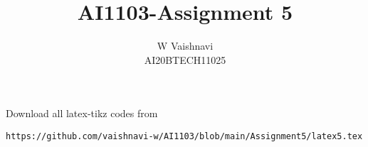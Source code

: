 \documentclass[journal,12pt,twocolumn]{IEEEtran}
\DeclareMathOperator*{\Res}{Res}
\begin{document}
\newcommand{\BEQA}{\begin{eqnarray}}
\newcommand{\EEQA}{\end{eqnarray}}
\newcommand{\define}{\stackrel{\triangle}{=}}

\raggedbottom
\setlength{\parindent}{0pt}
\providecommand{\mbf}{\mathbf}
\providecommand{\pr}[1]{\ensuremath{\Pr\left(#1\right)}}
\providecommand{\qfunc}[1]{\ensuremath{Q\left(#1\right)}}
\providecommand{\sbrak}[1]{\ensuremath{{}\left[#1\right]}}
\providecommand{\lsbrak}[1]{\ensuremath{{}\left[#1\right.}}
\providecommand{\rsbrak}[1]{\ensuremath{{}\left.#1\right]}}
\providecommand{\brak}[1]{\ensuremath{\left(#1\right)}}
\providecommand{\lbrak}[1]{\ensuremath{\left(#1\right.}}
\providecommand{\rbrak}[1]{\ensuremath{\left.#1\right)}}
\providecommand{\cbrak}[1]{\ensuremath{\left\{#1\right\}}}
\providecommand{\lcbrak}[1]{\ensuremath{\left\{#1\right.}}
\providecommand{\rcbrak}[1]{\ensuremath{\left.#1\right\}}}
\theoremstyle{remark}
\newtheorem{rem}{Remark}
\newcommand{\sgn}{\mathop{\mathrm{sgn}}}
\providecommand{\abs}[1]{\vert#1\vert}
\providecommand{\res}[1]{\Res\displaylimits_{#1}} 
\providecommand{\norm}[1]{\lVert#1\rVert}
\providecommand{\mtx}[1]{\mathbf{#1}}
\providecommand{\mean}[1]{E[ #1 ]}
\providecommand{\fourier}{\overset{\mathcal{F}}{ \rightleftharpoons}}
\providecommand{\system}{\overset{\mathcal{H}}{ \longleftrightarrow}}
\newcommand{\solution}{\noindent \textbf{Solution: }}
\newcommand{\cosec}{\,\text{cosec}\,}
\providecommand{\dec}[2]{\ensuremath{\overset{#1}{\underset{#2}{\gtrless}}}}
\newcommand{\myvec}[1]{\ensuremath{\begin{pmatrix}#1\end{pmatrix}}}
\newcommand{\mydet}[1]{\ensuremath{\begin{vmatrix}#1\end{vmatrix}}}
\makeatletter
{}
\makeatother
\let\StandardTheFigure\thefigure
\let\vec\mathbf
\renewcommand{\thefigure}{\theproblem}
\def\putbox#1#2#3{\makebox[0in][l]{\makebox[#1][l]{}\raisebox{\baselineskip}[0in][0in]{\raisebox{#2}[0in][0in]{#3}}}}
     \def\rightbox#1{\makebox[0in][r]{#1}}
     \def\centbox#1{\makebox[0in]{#1}}
     \def\topbox#1{\raisebox{-\baselineskip}[0in][0in]{#1}}
     \def\midbox#1{\raisebox{-0.5\baselineskip}[0in][0in]{#1}}
\vspace{3cm}
\title{AI1103-Assignment 5}
\author{W Vaishnavi\\AI20BTECH11025}
\maketitle
\newpage
\bigskip
\renewcommand{\thefigure}{\theenumi}
\renewcommand{\thetable}{\theenumi}
Download all latex-tikz codes from 
%
\begin{lstlisting}
https://github.com/vaishnavi-w/AI1103/blob/main/Assignment5/latex5.tex
\end{lstlisting}
\end{document}
